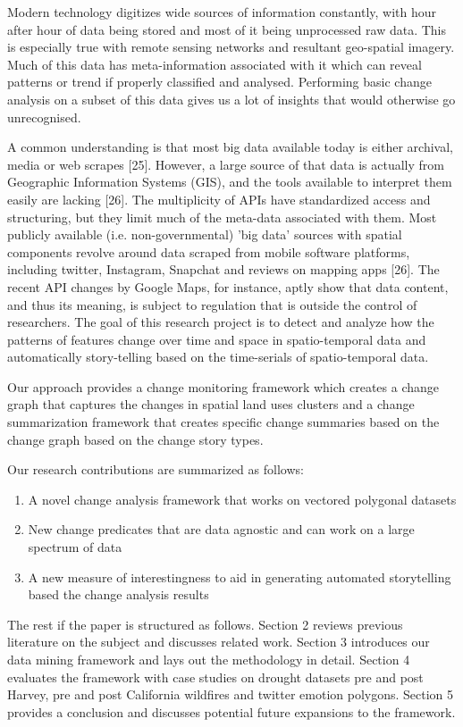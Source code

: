 \documentclass[conference]{IEEEtran}
\begin{document}
Modern technology digitizes wide sources of information constantly, with hour after hour of data being stored and most of it being unprocessed raw data. This is especially true with remote sensing networks and resultant geo-spatial imagery. Much of this data has meta-information associated with it which can reveal patterns or trend if properly classified and analysed. Performing basic change analysis on a subset of this data gives us a lot of insights that would otherwise go unrecognised.

A common understanding is that most big data available today is either archival, media or web scrapes [25]. However, a large source of that data is actually from Geographic Information Systems (GIS), and the tools available to interpret them easily are lacking [26]. The multiplicity of APIs have standardized access and structuring, but they limit much of the meta-data associated with them. Most publicly available (i.e. non-governmental) 'big data' sources with spatial components revolve around data scraped from mobile software platforms, including twitter, Instagram, Snapchat and reviews on mapping apps [26]. The recent API changes by Google Maps, for instance, aptly show that data content, and thus its meaning, is subject to regulation that is outside the control of researchers. The goal of this research project is to detect and analyze how the patterns of features change over time and space in spatio-temporal data and automatically story-telling based on the time-serials of spatio-temporal data.

Our approach provides a change monitoring framework which creates a change graph that captures the changes in spatial land uses clusters and a change summarization framework that creates specific change summaries based on the change graph based on the change story types. 

Our research contributions are summarized as follows:

\begin{enumerate}
 \item A novel change analysis framework that works on vectored polygonal datasets
 \item New change predicates that are data agnostic and can work on a large spectrum of data
 \item A new measure of interestingness to aid in generating automated storytelling based the change analysis results
\end{enumerate}

The rest if the paper is structured as follows. Section 2 reviews previous literature on the subject and discusses related work.  Section 3 introduces our data mining framework and lays out the methodology in detail. Section 4 evaluates the framework with case studies on drought datasets pre and post Harvey, pre and post California wildfires and twitter emotion polygons. Section 5 provides a conclusion and discusses potential future expansions to the framework.
\end{document}
